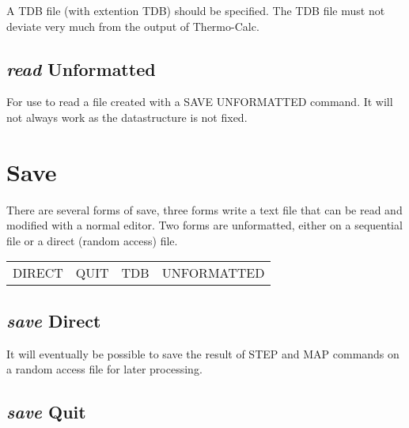 \documentclass[12pt]{article}
\begin{document}
A TDB file (with extention TDB) should be specified.  The TDB file
must not deviate very much from the output of Thermo-Calc.

\subsection{{\em read} Unformatted}

For use to read a file created with a SAVE UNFORMATTED command.  It
will not always work as the datastructure is not fixed.

\section{Save }

There are several forms of save, three forms write a text file that
can be read and modified with a normal editor.  Two forms are
unformatted, either on a sequential file or a direct (random access)
file.

\begin{tabular}{llll}
 DIRECT          & QUIT    & TDB &         UNFORMATTED\\
\end{tabular}

\subsection{{\em save} Direct}

It will eventually be possible to save the result of STEP and MAP
commands on a random access file for later processing.

\subsection{{\em save} Quit}
\end{document}
